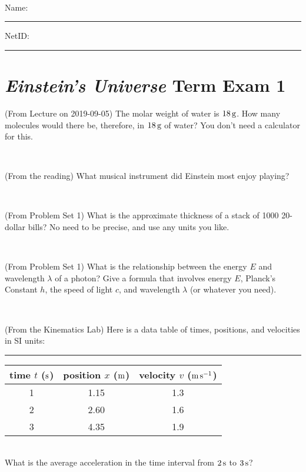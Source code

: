 \documentclass[12pt, letterpaper]{article}
\begin{document}
\vfill ~


\cleardoublepage



\noindent
Name: \rule[-1ex]{0.60\textwidth}{0.1pt}
NetID: \rule[-1ex]{0.20\textwidth}{0.1pt}

\section*{\textsl{Einstein's Universe} Term Exam 1}
\setcounter{problem}{1}


\begin{problem} (From Lecture on 2019-09-05)
The molar weight of water is $18\,\mathrm{g}$. How many molecules would there
be, therefore, in $18\,\mathrm{g}$ of water? You don't need a calculator for
this.
\end{problem}


\vfill ~

\begin{problem} (From the reading)
What musical instrument did Einstein most enjoy playing?
\end{problem}


\vfill ~

\begin{problem} (From Problem Set 1)
What is the approximate thickness of a stack of 1000 20-dollar bills?
No need to be precise, and use any units you like.
\end{problem}


\vfill ~

\begin{problem} (From Problem Set 1)
What is the relationship between the energy $E$ and wavelength
$\lambda$ of a photon? Give a formula that involves energy $E$,
Planck's Constant $h$, the speed of light $c$, and wavelength
$\lambda$ (or whatever you need).
\end{problem}

\vfill ~


\clearpage


\begin{problem} (From the Kinematics Lab)
Here is a data table of times, positions, and velocities in SI units:\\
\rule{1.0in}{0pt}\begin{tabular}{c|c|c}
time $t$ ($\mathrm{s}$) & position $x$ ($\mathrm{m}$) & velocity $v$ ($\mathrm{m}\,\mathrm{s}^{-1}$) \\
\hline
1 & 1.15 & 1.3 \\
2 & 2.60 & 1.6 \\
3 & 4.35 & 1.9 \\
\hline
\end{tabular}\\
What is the average acceleration in the time interval from $2\,\mathrm{s}$ to $3\,\mathrm{s}$?
\end{problem}
\end{document}
